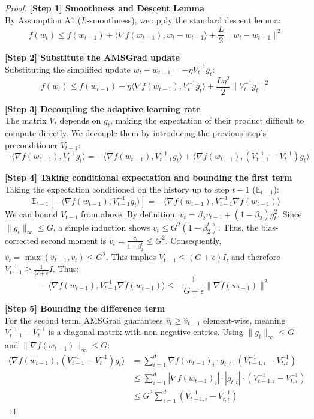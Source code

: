 \documentclass{article}
\begin{document}
\begin{proof}
\textbf{[Step 1] Smoothness and Descent Lemma} \\
By Assumption A1 ($L$-smoothness), we apply the standard descent lemma:
\[ f(w_t) \le f(w_{t-1}) + \langle \nabla f(w_{t-1}), w_t - w_{t-1} \rangle + \frac{L}{2} \|w_t - w_{t-1}\|^2 \]

\textbf{[Step 2] Substitute the AMSGrad update} \\
Substituting the simplified update $w_t - w_{t-1} = - \eta V_t^{-1} g_t$:
\[ f(w_t) \le f(w_{t-1}) - \eta \langle \nabla f(w_{t-1}), V_t^{-1} g_t \rangle + \frac{L \eta^2}{2} \|V_t^{-1} g_t\|^2 \]

\textbf{[Step 3] Decoupling the adaptive learning rate} \\
The matrix $V_t$ depends on $g_t$, making the expectation of their product difficult to compute directly. We decouple them by introducing the previous step's preconditioner $V_{t-1}$:
\[ -\langle \nabla f(w_{t-1}), V_t^{-1} g_t \rangle = -\langle \nabla f(w_{t-1}), V_{t-1}^{-1} g_t \rangle + \langle \nabla f(w_{t-1}), (V_{t-1}^{-1} - V_t^{-1}) g_t \rangle \]

\textbf{[Step 4] Taking conditional expectation and bounding the first term} \\
Taking the expectation conditioned on the history up to step $t-1$ ($\mathbb{E}_{t-1}$):
\[ \mathbb{E}_{t-1}[-\langle \nabla f(w_{t-1}), V_{t-1}^{-1} g_t \rangle] = -\langle \nabla f(w_{t-1}), V_{t-1}^{-1} \nabla f(w_{t-1}) \rangle \]
We can bound $V_{t-1}$ from above. By definition, $v_t = \beta_2 v_{t-1} + (1-\beta_2) g_t^2$. Since $\|g_t\|_\infty \le G$, a simple induction shows $v_t \le G^2(1-\beta_2^t)$. Thus, the bias-corrected second moment is $\tilde{v}_t = \frac{v_t}{1-\beta_2^t} \le G^2$. Consequently, $\hat{v}_t = \max(\hat{v}_{t-1}, \tilde{v}_t) \le G^2$. 
This implies $V_{t-1} \le (G + \epsilon) I$, and therefore $V_{t-1}^{-1} \ge \frac{1}{G + \epsilon} I$.
Thus:
\[ -\langle \nabla f(w_{t-1}), V_{t-1}^{-1} \nabla f(w_{t-1}) \rangle \le -\frac{1}{G + \epsilon} \|\nabla f(w_{t-1})\|^2 \]

\textbf{[Step 5] Bounding the difference term} \\
For the second term, AMSGrad guarantees $\hat{v}_t \ge \hat{v}_{t-1}$ element-wise, meaning $V_{t-1}^{-1} - V_t^{-1}$ is a diagonal matrix with non-negative entries. Using $\|g_t\|_\infty \le G$ and $\|\nabla f(w_{t-1})\|_\infty \le G$:
\begin{align*}
\langle \nabla f(w_{t-1}), (V_{t-1}^{-1} - V_t^{-1}) g_t \rangle &= \sum_{i=1}^d \nabla f(w_{t-1})_i \cdot g_{t,i} \cdot (V_{t-1,i}^{-1} - V_{t,i}^{-1}) \\
&\le \sum_{i=1}^d |\nabla f(w_{t-1})_i| \cdot |g_{t,i}| \cdot (V_{t-1,i}^{-1} - V_{t,i}^{-1}) \\
&\le G^2 \sum_{i=1}^d (V_{t-1,i}^{-1} - V_{t,i}^{-1})
\end{align*}


\end{proof}
\end{document}

